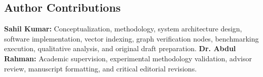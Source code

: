 \subsection*{Author Contributions}
\textbf{Sahil Kumar:} Conceptualization, methodology, system architecture design, software implementation, vector indexing, graph verification nodes, benchmarking execution, qualitative analysis, and original draft preparation. \textbf{Dr. Abdul Rahman:} Academic supervision, experimental methodology validation, advisor review, manuscript formatting, and critical editorial revisions.
